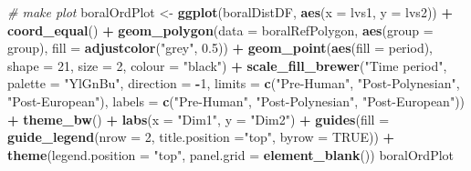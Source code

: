\documentclass[nofonts,]{tufte-handout}
\newenvironment{Shaded}{\begin{snugshade}}{\end{snugshade}}
\newcommand{\AttributeTok}[1]{\textcolor[rgb]{0.13,0.29,0.53}{#1}}
\newcommand{\CommentTok}[1]{\textcolor[rgb]{0.56,0.35,0.01}{\textit{#1}}}
\newcommand{\ConstantTok}[1]{\textcolor[rgb]{0.56,0.35,0.01}{#1}}
\newcommand{\DecValTok}[1]{\textcolor[rgb]{0.00,0.00,0.81}{#1}}
\newcommand{\FloatTok}[1]{\textcolor[rgb]{0.00,0.00,0.81}{#1}}
\newcommand{\FunctionTok}[1]{\textcolor[rgb]{0.13,0.29,0.53}{\textbf{#1}}}
\newcommand{\NormalTok}[1]{#1}
\newcommand{\OtherTok}[1]{\textcolor[rgb]{0.56,0.35,0.01}{#1}}
\newcommand{\SpecialCharTok}[1]{\textcolor[rgb]{0.81,0.36,0.00}{\textbf{#1}}}
\newcommand{\StringTok}[1]{\textcolor[rgb]{0.31,0.60,0.02}{#1}}
\begin{document}
\begin{Shaded}
\begin{Highlighting}[]
\CommentTok{\# make plot}
\NormalTok{boralOrdPlot }\OtherTok{\textless{}{-}} \FunctionTok{ggplot}\NormalTok{(boralDistDF, }
                       \FunctionTok{aes}\NormalTok{(}\AttributeTok{x =}\NormalTok{ lvs1, }\AttributeTok{y =}\NormalTok{ lvs2)) }\SpecialCharTok{+}
  \FunctionTok{coord\_equal}\NormalTok{() }\SpecialCharTok{+}
  \FunctionTok{geom\_polygon}\NormalTok{(}\AttributeTok{data =}\NormalTok{ boralRefPolygon, }
               \FunctionTok{aes}\NormalTok{(}\AttributeTok{group =}\NormalTok{ group),}
               \AttributeTok{fill =} \FunctionTok{adjustcolor}\NormalTok{(}\StringTok{"grey"}\NormalTok{, }\FloatTok{0.5}\NormalTok{)) }\SpecialCharTok{+}
  \FunctionTok{geom\_point}\NormalTok{(}\FunctionTok{aes}\NormalTok{(}\AttributeTok{fill =}\NormalTok{ period),}
             \AttributeTok{shape =} \DecValTok{21}\NormalTok{,}
             \AttributeTok{size =} \DecValTok{2}\NormalTok{,}
             \AttributeTok{colour =} \StringTok{"black"}\NormalTok{) }\SpecialCharTok{+}
  \FunctionTok{scale\_fill\_brewer}\NormalTok{(}\StringTok{"Time period"}\NormalTok{, }
                    \AttributeTok{palette =} \StringTok{"YlGnBu"}\NormalTok{,}
                    \AttributeTok{direction =} \SpecialCharTok{{-}}\DecValTok{1}\NormalTok{,}
                    \AttributeTok{limits =} \FunctionTok{c}\NormalTok{(}\StringTok{"Pre{-}Human"}\NormalTok{, }
                               \StringTok{"Post{-}Polynesian"}\NormalTok{, }
                               \StringTok{"Post{-}European"}\NormalTok{),}
                    \AttributeTok{labels =} \FunctionTok{c}\NormalTok{(}\StringTok{"Pre{-}Human"}\NormalTok{, }
                               \StringTok{"Post{-}Polynesian"}\NormalTok{, }
                               \StringTok{"Post{-}European"}\NormalTok{)) }\SpecialCharTok{+}
  \FunctionTok{theme\_bw}\NormalTok{() }\SpecialCharTok{+}
  \FunctionTok{labs}\NormalTok{(}\AttributeTok{x =} \StringTok{"Dim1"}\NormalTok{, }\AttributeTok{y =} \StringTok{"Dim2"}\NormalTok{) }\SpecialCharTok{+}
  \FunctionTok{guides}\NormalTok{(}\AttributeTok{fill =} \FunctionTok{guide\_legend}\NormalTok{(}\AttributeTok{nrow =} \DecValTok{2}\NormalTok{, }
                             \AttributeTok{title.position =}\StringTok{"top"}\NormalTok{,}
                             \AttributeTok{byrow =} \ConstantTok{TRUE}\NormalTok{)) }\SpecialCharTok{+}
  \FunctionTok{theme}\NormalTok{(}\AttributeTok{legend.position =} \StringTok{"top"}\NormalTok{,}
       \AttributeTok{panel.grid =} \FunctionTok{element\_blank}\NormalTok{())}
\NormalTok{boralOrdPlot}
\end{Highlighting}
\end{Shaded}
\end{document}
